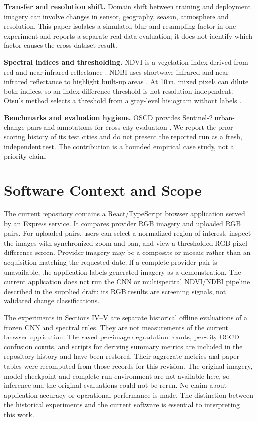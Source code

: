 \documentclass[conference]{IEEEtran}
\begin{document}
\textbf{Transfer and resolution shift.} Domain shift between training and
deployment imagery can involve changes in sensor, geography, season,
atmosphere and resolution. This paper isolates a simulated
blur-and-resampling factor in one experiment and reports a separate real-data
evaluation; it does not identify which factor causes the cross-dataset result.

\textbf{Spectral indices and thresholding.} NDVI is a vegetation index derived
from red and near-infrared reflectance \cite{rouse1974vegetation}. NDBI uses
shortwave-infrared and near-infrared reflectance to highlight built-up areas
\cite{zha2003ndbi}. At 10\,m, mixed pixels can dilute both indices, so an index
difference threshold is not resolution-independent. Otsu's method selects a
threshold from a gray-level histogram without labels \cite{otsu1979threshold}.

\textbf{Benchmarks and evaluation hygiene.} OSCD provides Sentinel-2
urban-change pairs and annotations for cross-city evaluation
\cite{daudt2018oscd}. We report the prior scoring history of its test cities
and do not present the reported run as a fresh, independent test. The
contribution is a bounded empirical case study, not a priority claim.

\section{Software Context and Scope}
The current repository contains a React/TypeScript browser application served
by an Express service. It compares provider RGB imagery and uploaded RGB pairs.
For uploaded pairs, users can select a normalized region of interest, inspect
the images with synchronized zoom and pan, and view a thresholded RGB
pixel-difference screen. Provider imagery may be a composite or mosaic rather
than an acquisition matching the requested date. If a complete provider pair
is unavailable, the application labels generated imagery as a demonstration.
The current application does not run the CNN or multispectral NDVI/NDBI
pipeline described in the supplied draft; its RGB results are screening
signals, not validated change classifications.

The experiments in Sections IV--V are separate historical offline evaluations
of a frozen CNN and spectral rules. They are not measurements of the current
browser application. The saved per-image degradation counts, per-city OSCD
confusion counts, and scripts for deriving summary metrics are included in the
repository history and have been restored. Their aggregate metrics and paper
tables were recomputed from those records for this revision. The original
imagery, model checkpoint and complete run environment are not available here,
so inference and the original evaluations could not be rerun. No claim about
application accuracy or operational performance is made. The distinction
between the historical experiments and the current software is essential to
interpreting this work.
\end{document}
